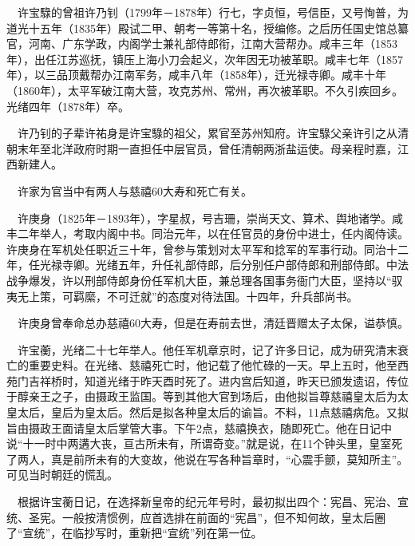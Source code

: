 \begin{frame}
	$\quad$许宝騄的曾祖许乃钊（1799年－1878年）行七，字贞恒，号信臣，又号恂普，为道光十五年（1835年）殿试二甲、朝考一等第十名，授编修。之后历任国史馆总纂官，河南、广东学政，内阁学士兼礼部侍郎衔，江南大营帮办。咸丰三年（1853年），出任江苏巡抚，镇压上海小刀会起义，次年因无功被革职。咸丰七年（1857年），以三品顶戴帮办江南军务，咸丰八年（1858年），迁光禄寺卿。咸丰十年（1860年），太平军破江南大营，攻克苏州、常州，再次被革职。不久引疾回乡。光绪四年（1878年）卒。
	
	$\quad$许乃钊的子辈许祐身是许宝騄的祖父，累官至苏州知府。许宝騄父亲许引之从清朝末年至北洋政府时期一直担任中层官员，曾任清朝两浙盐运使。母亲程时嘉，江西新建人。
\end{frame}

\begin{frame}
	$\quad$许家为官当中有两人与慈禧60大寿和死亡有关。
	
	$\quad$许庚身（1825年－1893年），字星叔，号吉珊，崇尚天文、算术、舆地诸学。咸丰二年举人，考取内阁中书。同治元年，以在任官员的身份中进士，任内阁侍读。许庚身在军机处任职近三十年，曾参与策划对太平军和捻军的军事行动。同治十二年，任光禄寺卿。光绪五年，升任礼部侍郎，后分别任户部侍郎和刑部侍郎。中法战争爆发，许以刑部侍郎身份任军机大臣，兼总理各国事务衙门大臣，坚持以“驭夷无上策，可羁縻，不可迁就”的态度对待法国。十四年，升兵部尚书。
	
	$\quad$许庚身曾奉命总办慈禧60大寿，但是在寿前去世，清廷晋赠太子太保，谥恭慎。
	
\end{frame}

\begin{frame}
	$\quad$许宝蘅，光绪二十七年举人。他任军机章京时，记了许多日记，成为研究清末衰亡的重要史料。在光绪、慈禧死亡时，他记载了他忙碌的一天。早上五时，他至西苑门吉祥桥时，知道光绪于昨天酉时死了。进内宫后知道，昨天已颁发遗诏，传位于醇亲王之子，由摄政王监国。等到其他大官到场后，由他拟旨尊慈禧皇太后为太皇太后，皇后为皇太后。然后是拟各种皇太后的谕旨。不料，11点慈禧病危。又拟旨由摄政王面请皇太后掌管大事。下午2点，慈禧换衣，随即死亡。他在日记中说“十一时中两遘大丧，亘古所未有，所谓奇变。”就是说，在11个钟头里，皇室死了两人，真是前所未有的大变故，他说在写各种旨章时，“心震手颤，莫知所主”。可见当时朝廷的慌乱。 
	
	$\quad$根据许宝蘅日记，在选择新皇帝的纪元年号时，最初拟出四个：宪昌、宪治、宣统、圣宪。一般按清惯例，应首选排在前面的“宪昌”，但不知何故，皇太后圈了“宣统”，在临抄写时，重新把“宣统”列在第一位。	
\end{frame}

